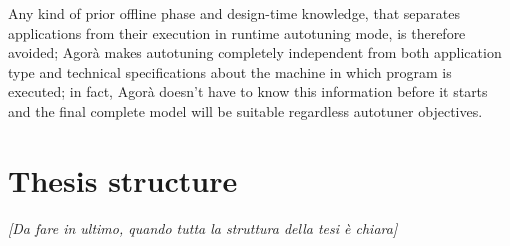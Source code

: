 Any kind of prior offline phase and design-time knowledge, that separates applications from their execution in runtime autotuning mode, is therefore avoided; Agorà makes autotuning completely independent from both application type and technical specifications about the machine in which program is executed; in fact, Agorà doesn't have to know this information before it starts and the final complete model will be suitable regardless autotuner objectives.





\section{Thesis structure}

\textit{ [Da fare in ultimo, quando tutta la struttura della tesi è chiara] }
